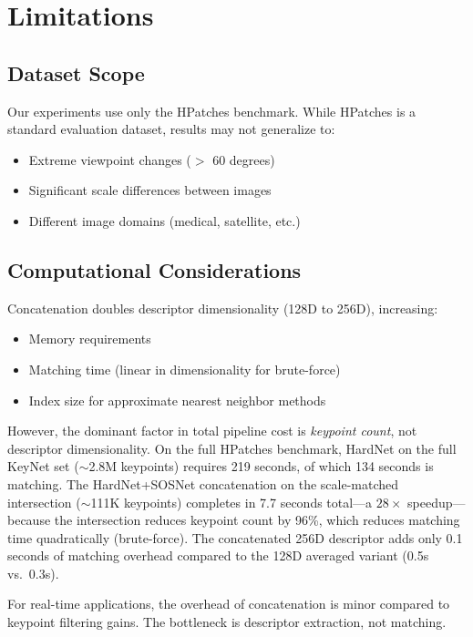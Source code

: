 \section{Limitations}

\subsection{Dataset Scope}

Our experiments use only the HPatches benchmark. While HPatches is a standard evaluation dataset, results may not generalize to:
\begin{itemize}
    \item Extreme viewpoint changes ($>$ 60 degrees)
    \item Significant scale differences between images
    \item Different image domains (medical, satellite, etc.)
\end{itemize}

\subsection{Computational Considerations}

Concatenation doubles descriptor dimensionality (128D to 256D), increasing:
\begin{itemize}
    \item Memory requirements
    \item Matching time (linear in dimensionality for brute-force)
    \item Index size for approximate nearest neighbor methods
\end{itemize}

However, the dominant factor in total pipeline cost is \textit{keypoint count}, not descriptor dimensionality. On the full HPatches benchmark, HardNet on the full KeyNet set ($\sim$2.8M keypoints) requires 219 seconds, of which 134 seconds is matching. The HardNet+SOSNet concatenation on the scale-matched intersection ($\sim$111K keypoints) completes in 7.7 seconds total---a $28\times$ speedup---because the intersection reduces keypoint count by 96\%, which reduces matching time quadratically (brute-force). The concatenated 256D descriptor adds only 0.1 seconds of matching overhead compared to the 128D averaged variant (0.5s vs.\ 0.3s).

For real-time applications, the overhead of concatenation is minor compared to keypoint filtering gains. The bottleneck is descriptor extraction, not matching.

